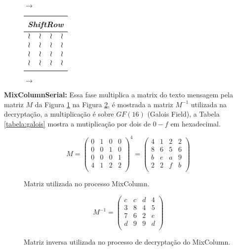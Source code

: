 \documentclass[runningheads,a4paper,11pt]{llncs}
\begin{document}
\begin{figure}
\begin{tabular}{|c|c|c|c|}
	\end{tabular} $\rightarrow$
	\begin{tabular}{|c|c|c|c|}
		\multicolumn{4}{c}{\textit{ShiftRow}}\\\hline
		$\wr$&$\wr$&$\wr$&$\wr$\\
		$\wr$&$\wr$&$\wr$&$\wr$\\
		$\wr$&$\wr$&$\wr$&$\wr$\\
		$\wr$&$\wr$&$\wr$&$\wr$\\\hline
		\multicolumn{1}{c}{ \hspace{.5cm} }&\multicolumn{1}{c}{ \hspace{.5cm} }&\multicolumn{1}{c}{ \hspace{.5cm} }&\multicolumn{1}{c}{ \hspace{.5cm} }\\
	\end{tabular} $\rightarrow$
\end{figure}

\noindent\textbf{MixColumnSerial:} Essa fase multiplica a matrix do texto mensagem pela matriz $M$ da Figura \ref{figura:matriz} na Figura \ref{figura:inv_matriz}, \'e mostrada a matriz $M^{-1}$ utilizada na decrypta\c{c}\~ao, a multiplica\c{c}\~ao \'e sobre $GF(16)$ (Galois Field), a Tabela \ref{tabela:galois} mostra a mutiplica\c{c}\~ao por dois de $0-f$ em hexadecimal. 

\begin{figure}
	\caption{Matriz utilizada no processo MixColumn.\label{figura:matriz}}
	\[
	M = 
	\begin{pmatrix}
	0 & 1 & 0 & 0 \\
	0 & 0 & 1 & 0 \\
	0 & 0 & 0 & 1 \\
	4 & 1 & 2 & 2 \\
	\end{pmatrix}^4
	=
	\begin{pmatrix}
	4 & 1 & 2 & 2 \\
	8 & 6 & 5 & 6 \\
	b & e & a & 9 \\
	2 & 2 & f & b \\
	\end{pmatrix}
	\]
\end{figure}

\begin{figure}
	\caption{Matriz inversa utilizada no processo de decrypta\c{c}\~ao do MixColumn.\label{figura:inv_matriz}}
	\[
	M^{-1}
	=
	\begin{pmatrix}
	c & c & d & 4 \\
	3 & 8 & 4 & 5 \\
	7 & 6 & 2 & e \\
	d & 9 & 9 & d \\
	\end{pmatrix}
	\]
\end{figure}
\end{document}
